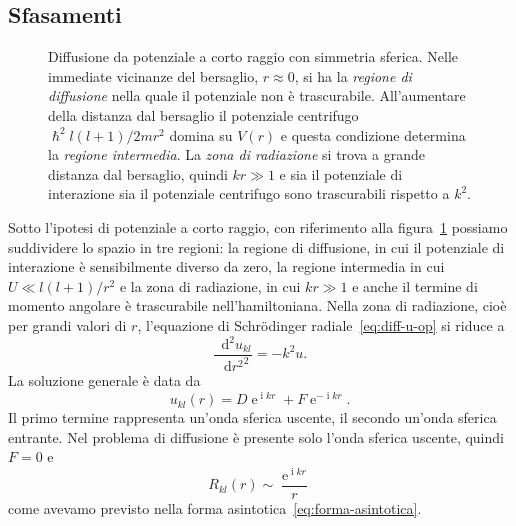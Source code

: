 \documentclass[a4paper,fleqn,twoside,12pt]{article}
\newcommand*{\dd}{\mathop{}\!\mathrm{d}} %
\DeclareMathOperator{\e}{\mathrm{e}} %
\DeclareMathOperator{\uimm}{\mathrm{i}} %
\newcommand*{\toder}[3][]{\frac{{\dd^{#1}}#2}{\dd {#3}^{#1}}}
\begin{document}
\subsection{Sfasamenti}
\label{sec:sfasamenti}

\begin{figure}
  \centering
  \caption{Diffusione da potenziale a corto raggio con simmetria sferica.  Nelle
    immediate vicinanze del bersaglio, $r \approx 0$, si ha la
    \emph{regione di diffusione} nella quale il potenziale non è trascurabile.
    All'aumentare della distanza dal bersaglio il potenziale centrifugo
    $\hslash^2 l(l+1)/2mr^2$ domina su $V(r)$ e questa condizione determina la
    \emph{regione intermedia}.  La \emph{zona di radiazione} si trova a grande
    distanza dal bersaglio, quindi $kr \gg 1$ e sia il potenziale di interazione
    sia il potenziale centrifugo sono trascurabili rispetto a $k^2$.}
\label{fig:regioni-potenziale-sferico}
\end{figure}
Sotto l'ipotesi di potenziale a corto raggio, con riferimento alla
figura~\ref{fig:regioni-potenziale-sferico} possiamo suddividere lo spazio in
tre regioni: la regione di diffusione, in cui il potenziale di interazione è
sensibilmente diverso da zero, la regione intermedia in cui $U \ll l(l+1)/r^{2}$
e la zona di radiazione, in cui $kr \gg 1$ e anche il termine di momento
angolare è trascurabile nell'hamiltoniana.  Nella zona di radiazione, cioè per
grandi valori di $r$, l'equazione di Schrödinger radiale~\eqref{eq:diff-u-op} si
riduce a
\begin{equation}
  \toder[2]{u_{kl}}{r^{2}} = -k^{2}u.
\end{equation}
La soluzione generale è data da
\begin{equation}
  u_{kl}(r) = D\e^{\uimm kr} + F\e^{-\uimm kr}.
\end{equation}
Il primo termine rappresenta un'onda sferica uscente, il secondo un'onda sferica
entrante.  Nel problema di diffusione è presente solo l'onda sferica uscente,
quindi $F = 0$ e
\begin{equation}
  R_{kl}(r) \sim \frac{\e^{\uimm kr}}{r}
\end{equation}
come avevamo previsto nella forma asintotica~\eqref{eq:forma-asintotica}.
\end{document}
